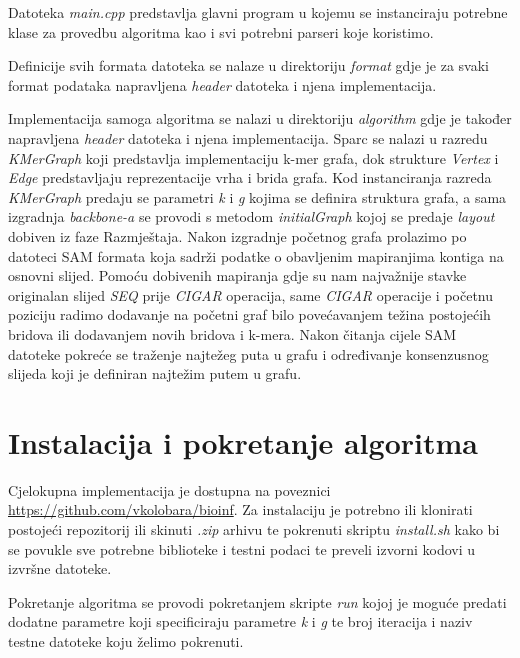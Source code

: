 \documentclass[times, utf8, seminar, numeric]{fer}
\begin{document}
Datoteka \emph{main.cpp} predstavlja glavni program u kojemu se instanciraju potrebne klase za provedbu algoritma kao i svi potrebni parseri koje koristimo.

Definicije svih formata datoteka se nalaze u direktoriju \emph{format} gdje je za svaki format podataka napravljena \emph{header} datoteka i njena implementacija.

Implementacija samoga algoritma se nalazi u direktoriju \emph{algorithm} gdje je također napravljena \emph{header} datoteka i njena implementacija. Sparc se nalazi u razredu \emph{KMerGraph} koji predstavlja implementaciju k-mer grafa, dok strukture \emph{Vertex} i \emph{Edge} predstavljaju reprezentacije vrha i brida grafa. Kod instanciranja razreda \emph{KMerGraph} predaju se parametri \emph{k} i \emph{g} kojima se definira struktura grafa, a sama izgradnja \emph{backbone-a} se provodi s metodom \emph{initialGraph} kojoj se predaje \emph{layout} dobiven iz faze Razmještaja. Nakon izgradnje početnog grafa prolazimo po datoteci SAM formata koja sadrži podatke o obavljenim mapiranjima kontiga na osnovni slijed. Pomoću dobivenih mapiranja gdje su nam najvažnije stavke originalan slijed \emph{SEQ} prije \emph{CIGAR} operacija, same \emph{CIGAR} operacije i početnu poziciju radimo dodavanje na početni graf bilo povećavanjem težina postojećih bridova ili dodavanjem novih bridova i k-mera. Nakon čitanja cijele SAM datoteke pokreće se traženje najtežeg puta u grafu i određivanje konsenzusnog slijeda koji je definiran najtežim putem u grafu.

\section{Instalacija i pokretanje algoritma}
Cjelokupna implementacija je dostupna na poveznici \url{https://github.com/vkolobara/bioinf}. Za instalaciju je potrebno ili klonirati postojeći repozitorij ili skinuti \emph{.zip} arhivu te pokrenuti skriptu \emph{install.sh} kako bi se povukle sve potrebne biblioteke i testni podaci te preveli izvorni kodovi u izvršne datoteke. 

Pokretanje algoritma se provodi pokretanjem skripte \emph{run} kojoj je moguće predati dodatne parametre koji specificiraju parametre \emph{k} i \emph{g} te broj iteracija i naziv testne datoteke koju želimo pokrenuti.

\end{document}
